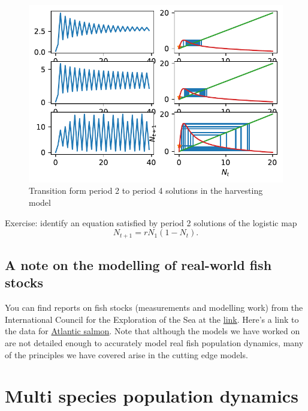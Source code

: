\documentclass[
  letterpaper,
  DIV=11,
  numbers=noendperiod]{scrreprt}
\begin{document}
\begin{figure}

{\centering \includegraphics{MA32009-SinglePopDiscreteTimea_files/figure-pdf/fig-densharvestingmodelcobwebp4-output-1.pdf}

}

\caption{\label{fig-densharvestingmodelcobwebp4}Transition form period 2
to period 4 solutions in the harvesting model}

\end{figure}

Exercise: identify an equation satisfied by period 2 solutions of the
logistic map \[ 
 N_{t+1}=rN_1(1-N_t).
\]

\hypertarget{a-note-on-the-modelling-of-real-world-fish-stocks}{%
\section{A note on the modelling of real-world fish
stocks}\label{a-note-on-the-modelling-of-real-world-fish-stocks}}

You can find reports on fish stocks (measurements and modelling work)
from the International Council for the Exploration of the Sea at the
\href{http://www.ices.dk/Pages/default.aspx}{link}. Here's a link to the
data for \href{https://tinyurl.com/ya8sh72j}{Atlantic salmon}. Note that
although the models we have worked on are not detailed enough to
accurately model real fish population dynamics, many of the principles
we have covered arise in the cutting edge models.

\hypertarget{multi-species-population-dynamics}{%
\chapter{Multi species population
dynamics}\label{multi-species-population-dynamics}}
\end{document}
